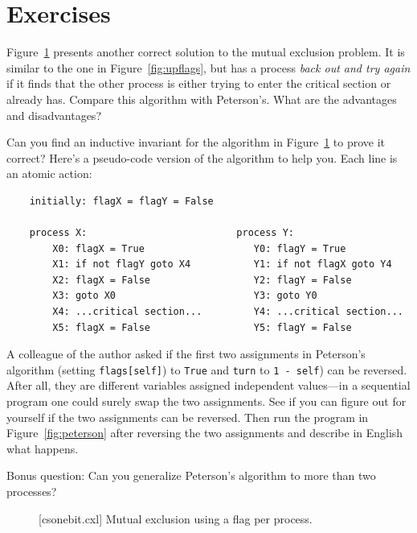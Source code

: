 \documentclass{report}
\newenvironment{code}{
\tcolorbox
}{
\endtcolorbox
}
\begin{document}
\section*{Exercises}
\begin{problems}
\item Figure~\ref{fig:csonebit} presents another correct solution to the
mutual exclusion problem.  It is similar to the one in
Figure~\ref{fig:upflags}, but has a process \emph{back out and try again}
if it finds that the other process is either trying to enter the critical
section or already has.  Compare this algorithm with Peterson's.  What are
the advantages and disadvantages?
\item
Can you find an inductive invariant for the algorithm in
Figure~\ref{fig:csonebit} to prove it correct?
Here's a pseudo-code version of the algorithm to help you.  Each line
is an atomic action:
\begin{code}
\begin{verbatim}
    initially: flagX = flagY = False

    process X:                          process Y:
        X0: flagX = True                   Y0: flagY = True
        X1: if not flagY goto X4           Y1: if not flagX goto Y4
        X2: flagX = False                  Y2: flagY = False
        X3: goto X0                        Y3: goto Y0
        X4: ...critical section...         Y4: ...critical section...
        X5: flagX = False                  Y5: flagY = False
\end{verbatim}
\end{code}
\item A colleague of the author asked if the first two assignments in
Peterson's algorithm (setting \texttt{flags[self]})
to \texttt{True} and \texttt{turn} to \texttt{1 - self}) can be reversed.
After all, they are different variables assigned independent values---in a
sequential program one could surely swap the two assignments.
See if you can figure out for yourself if the two assignments can be
reversed.  Then run the program in Figure~\ref{fig:peterson} after reversing
the two assignments and describe in English what happens.
\item Bonus question:
Can you generalize Peterson's algorithm to more than two processes?
\end{problems}

\begin{figure}
\begin{code}
\end{code}
\caption{[csonebit.cxl] Mutual exclusion using a flag per process.}
\label{fig:csonebit}
\end{figure}
\end{document}
